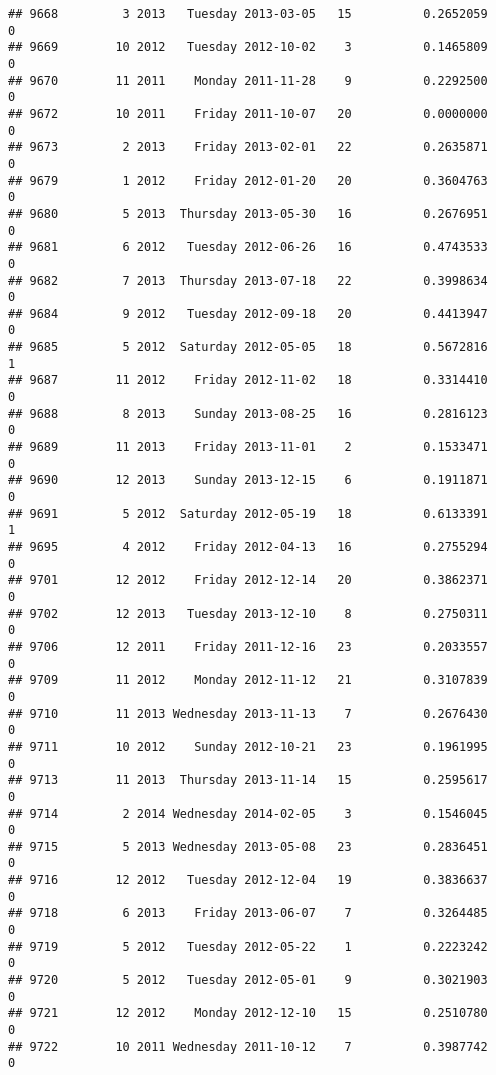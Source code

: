 \documentclass[
]{article}
\begin{document}
\begin{verbatim}
## 9668         3 2013   Tuesday 2013-03-05   15          0.2652059             0
## 9669        10 2012   Tuesday 2012-10-02    3          0.1465809             0
## 9670        11 2011    Monday 2011-11-28    9          0.2292500             0
## 9672        10 2011    Friday 2011-10-07   20          0.0000000             0
## 9673         2 2013    Friday 2013-02-01   22          0.2635871             0
## 9679         1 2012    Friday 2012-01-20   20          0.3604763             0
## 9680         5 2013  Thursday 2013-05-30   16          0.2676951             0
## 9681         6 2012   Tuesday 2012-06-26   16          0.4743533             0
## 9682         7 2013  Thursday 2013-07-18   22          0.3998634             0
## 9684         9 2012   Tuesday 2012-09-18   20          0.4413947             0
## 9685         5 2012  Saturday 2012-05-05   18          0.5672816             1
## 9687        11 2012    Friday 2012-11-02   18          0.3314410             0
## 9688         8 2013    Sunday 2013-08-25   16          0.2816123             0
## 9689        11 2013    Friday 2013-11-01    2          0.1533471             0
## 9690        12 2013    Sunday 2013-12-15    6          0.1911871             0
## 9691         5 2012  Saturday 2012-05-19   18          0.6133391             1
## 9695         4 2012    Friday 2012-04-13   16          0.2755294             0
## 9701        12 2012    Friday 2012-12-14   20          0.3862371             0
## 9702        12 2013   Tuesday 2013-12-10    8          0.2750311             0
## 9706        12 2011    Friday 2011-12-16   23          0.2033557             0
## 9709        11 2012    Monday 2012-11-12   21          0.3107839             0
## 9710        11 2013 Wednesday 2013-11-13    7          0.2676430             0
## 9711        10 2012    Sunday 2012-10-21   23          0.1961995             0
## 9713        11 2013  Thursday 2013-11-14   15          0.2595617             0
## 9714         2 2014 Wednesday 2014-02-05    3          0.1546045             0
## 9715         5 2013 Wednesday 2013-05-08   23          0.2836451             0
## 9716        12 2012   Tuesday 2012-12-04   19          0.3836637             0
## 9718         6 2013    Friday 2013-06-07    7          0.3264485             0
## 9719         5 2012   Tuesday 2012-05-22    1          0.2223242             0
## 9720         5 2012   Tuesday 2012-05-01    9          0.3021903             0
## 9721        12 2012    Monday 2012-12-10   15          0.2510780             0
## 9722        10 2011 Wednesday 2011-10-12    7          0.3987742             0

\end{verbatim}
\end{document}
